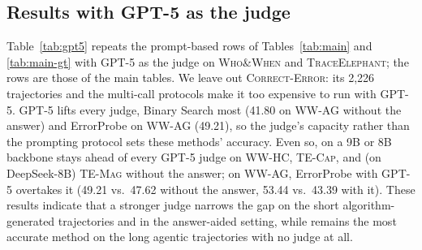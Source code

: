 
\subsection{Results with GPT-5 as the judge}
\label{app:prompting-gpt5}

Table~\ref{tab:gpt5} repeats the prompt-based rows of Tables~\ref{tab:main} and
\ref{tab:main-gt} with GPT-5 as the judge on \textsc{Who\&When} and \textsc{TraceElephant}; the
\soap{} rows are those of the main tables. We leave out \textsc{Correct-Error}: its 2{,}226
trajectories and the multi-call protocols make it too expensive to run with GPT-5.
GPT-5 lifts every judge, Binary Search most (41.80 on \textsc{WW-AG} without the answer) and
ErrorProbe on \textsc{WW-AG} (49.21), so the judge's capacity rather than the prompting
protocol sets these methods' accuracy. Even so, \soap{} on a 9B or 8B backbone stays
ahead of every GPT-5 judge on \textsc{WW-HC}, \textsc{TE-Cap}, and (on DeepSeek-8B) \textsc{TE-Mag} without the
answer; on \textsc{WW-AG}, ErrorProbe with GPT-5 overtakes it (49.21 vs.\ 47.62 without the
answer, 53.44 vs.\ 43.39 with it).
 These results indicate that a stronger judge narrows the gap on the short
algorithm-generated trajectories and in the answer-aided setting, while \soap{}
remains the most accurate method on the long agentic trajectories with no judge at
all.

